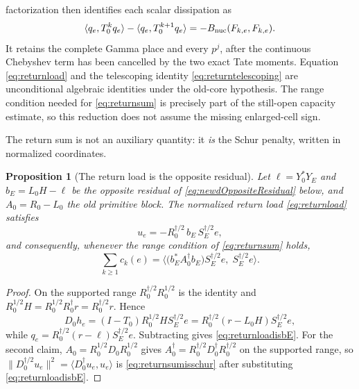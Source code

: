 \documentclass[11pt]{amsart}
\newtheorem{proposition}[theorem]{Proposition}
\theoremstyle{definition}
\theoremstyle{remark}
\begin{document}
factorization then identifies each scalar dissipation as
\begin{equation}\label{eq:returnDissipation}
 \langle q_e,T_0^kq_e\rangle-\langle q_e,T_0^{k+1}q_e\rangle
 =-B_{\rm nuc}(F_{k,e},F_{k,e}).
\end{equation}
It retains the complete Gamma place and every \(p^j\), after the continuous
Chebyshev term has been cancelled by the two exact Tate moments.  Equation
\eqref{eq:returnload} and the telescoping identity
\eqref{eq:returntelescoping} are unconditional algebraic identities under
the old-core hypothesis.  The range condition needed for
\eqref{eq:returnsum} is precisely part of the still-open capacity estimate,
so this reduction does not assume the missing enlarged-cell sign.

The return sum is not an auxiliary quantity: it \emph{is} the Schur penalty,
written in normalized coordinates.

\begin{proposition}[The return load is the opposite residual]
\label{prop:returnisschur}
Let \(\ell=Y_0^*Y_E\) and \(b_E=L_0H-\ell\) be the opposite residual of
\eqref{eq:newdOppositeResidual} below, and \(A_0=R_0-L_0\) the old primitive
block.  The normalized return load \eqref{eq:returnload} satisfies
\begin{equation}\label{eq:returnloadisbE}
 u_e=-R_0^{\dagger/2}\,b_E\,S_E^{\dagger/2}e ,
\end{equation}
and consequently, whenever the range condition of \eqref{eq:returnsum} holds,
\begin{equation}\label{eq:returnsumisschur}
 \sum_{k\ge1}c_k(e)
 =\bigl\langle
    \bigl(b_E^*A_0^\dagger b_E\bigr)S_E^{\dagger/2}e,\;S_E^{\dagger/2}e
  \bigr\rangle .
\end{equation}
\end{proposition}

\begin{proof}
On the supported range \(R_0^{\dagger/2}R_0^{1/2}\) is the identity and
\(R_0^{1/2}H=R_0^{1/2}R_0^\dagger r=R_0^{\dagger/2}r\).  Hence
\[
 D_0h_e=(I-T_0)R_0^{1/2}HS_E^{\dagger/2}e
       =R_0^{\dagger/2}(r-L_0H)S_E^{\dagger/2}e ,
\]
while \(q_e=R_0^{\dagger/2}(r-\ell)S_E^{\dagger/2}e\).  Subtracting gives
\eqref{eq:returnloadisbE}.  For the second claim, \(A_0=R_0^{1/2}D_0R_0^{1/2}\)
gives \(A_0^\dagger=R_0^{\dagger/2}D_0^\dagger R_0^{\dagger/2}\) on the
supported range, so
\(\|D_0^{\dagger/2}u_e\|^2
 =\langle D_0^\dagger u_e,u_e\rangle\) is
\eqref{eq:returnsumisschur} after substituting
\eqref{eq:returnloadisbE}.
\end{proof}
\end{document}
